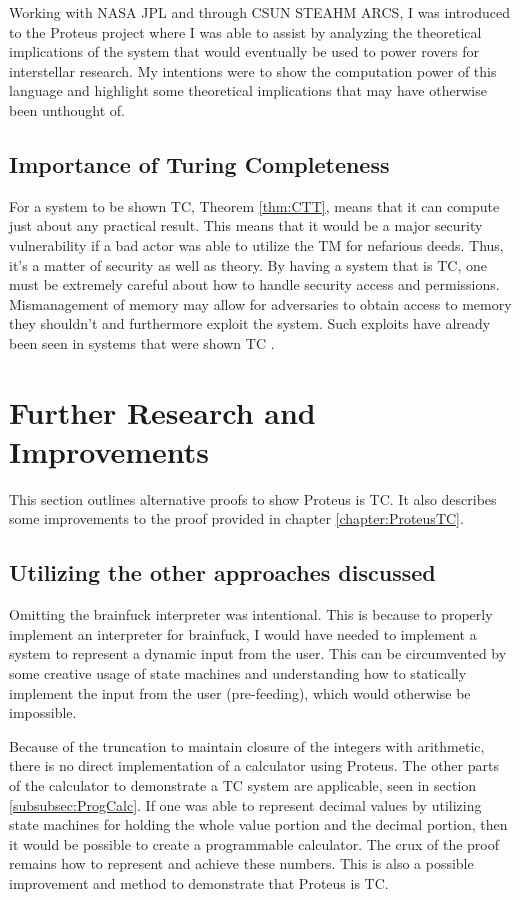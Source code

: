 Working with NASA JPL and through CSUN STEAHM ARCS, I was introduced to the Proteus project where I was able to assist by analyzing the theoretical implications of the system that would eventually be used to power rovers for interstellar research.
My intentions were to show the computation power of this language and highlight some theoretical implications that may have otherwise been unthought of.

\subsection{Importance of Turing Completeness}\label{subsec:ImportanceTC}

For a system to be shown TC, Theorem \ref{thm:CTT}, means that it can compute just about any practical result.
This means that it would be a major security vulnerability if a bad actor was able to utilize the TM for nefarious deeds.
Thus, it's a matter of security as well as theory.
By having a system that is TC, one must be extremely careful about how to handle security access and permissions.
Mismanagement of memory may allow for adversaries to obtain access to memory they shouldn't and furthermore exploit the system.
Such exploits have already been seen in systems that were shown TC \cite{SecVuln}.

\section{Further Research and Improvements}\label{sec:FurtherResImprov}

This section outlines alternative proofs to show Proteus is TC.
It also describes some improvements to the proof provided in chapter \ref{chapter:ProteusTC}.

\subsection{Utilizing the other approaches discussed}

Omitting the brainfuck interpreter was intentional.
This is because to properly implement an interpreter for brainfuck, I would have needed to implement a system to represent a dynamic input from the user.
This can be circumvented by some creative usage of state machines and understanding how to statically implement the input from the user (pre-feeding), which would otherwise be impossible.

Because of the truncation to maintain closure of the integers with arithmetic, there is no direct implementation of a calculator using Proteus.
The other parts of the calculator to demonstrate a TC system are applicable, seen in section \ref{subsubsec:ProgCalc}.
If one was able to represent decimal values by utilizing state machines for holding the whole value portion and the decimal portion, then it would be possible to create a programmable calculator.
The crux of the proof remains how to represent and achieve these numbers.
This is also a possible improvement and method to demonstrate that Proteus is TC.

